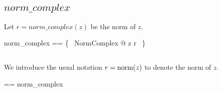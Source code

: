 \documentclass[11pt, oneside]{article}
\begin{document}
\subsection{$norm\_complex$}

Let $r = norm\_complex(z)$ be the norm of $z$.

\begin{zed}
	norm\_complex == \{~ NormComplex @ z \mapsto r ~\}
\end{zed}

\subsection{}

We introduce the usual notation $r = \operatorname{norm}(z)$ to denote the norm of $z$.

\begin{zed}
	\normC == norm\_complex
\end{zed}

\printbibliography
\end{document}
